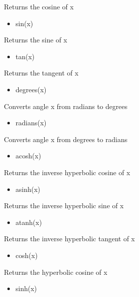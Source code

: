 \documentclass[11pt]{article}
\providecommand{\tightlist}{%
      \setlength{\itemsep}{0pt}\setlength{\parskip}{0pt}}
\begin{document}
Returns the cosine of x

\begin{itemize}
\tightlist
\item
  sin(x)
\end{itemize}

Returns the sine of x

\begin{itemize}
\tightlist
\item
  tan(x)
\end{itemize}

Returns the tangent of x

\begin{itemize}
\tightlist
\item
  degrees(x)
\end{itemize}

Converts angle x from radians to degrees

\begin{itemize}
\tightlist
\item
  radians(x)
\end{itemize}

Converts angle x from degrees to radians

\begin{itemize}
\tightlist
\item
  acosh(x)
\end{itemize}

Returns the inverse hyperbolic cosine of x

\begin{itemize}
\tightlist
\item
  asinh(x)
\end{itemize}

Returns the inverse hyperbolic sine of x

\begin{itemize}
\tightlist
\item
  atanh(x)
\end{itemize}

Returns the inverse hyperbolic tangent of x

\begin{itemize}
\tightlist
\item
  cosh(x)
\end{itemize}

Returns the hyperbolic cosine of x

\begin{itemize}
\tightlist
\item
  sinh(x)
\end{itemize}
\end{document}
